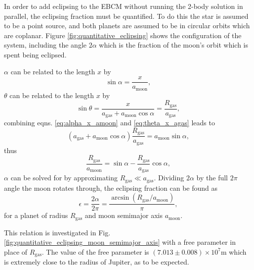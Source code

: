 \documentclass[12pt, onecolumn]{revtex4-2}    %
\begin{document}
In order to add eclipsing to the EBCM without running the 2-body solution in parallel, the eclipsing fraction must be quantified.
To do this the star is assumed to be a point source, and both planets are assumed to be in circular orbits which are coplanar.
Figure \ref{fig:quantitative_eclipsing} shows the configuration of the system, including the angle $2\alpha$ which is the fraction of the moon's orbit which is spent being eclipsed.

$\alpha$ can be related to the length $x$ by
\begin{equation}
  \sin \alpha = \frac{x}{a_\text{moon}}, \label{eq:alpha_x_amoon}
\end{equation}
$\theta$ can be related to the length $x$ by
\begin{equation}
  \sin \theta = \frac{x}{a_\text{gas} + a_\text{moon} \cos\alpha} = \frac{R_\text{gas}}{a_\text{gas}} , \label{eq:theta_x_agas}
\end{equation}
combining eqns. \eqref{eq:alpha_x_amoon} and \eqref{eq:theta_x_agas} leads to
\begin{equation}
  (a_\text{gas} + a_\text{moon}\cos\alpha) \frac{R_\text{gas}}{a_\text{gas}} = a_\text{moon} \sin\alpha,
\end{equation}
thus
\begin{equation}
  \frac{R_\text{gas}}{a_\text{moon}} = \sin\alpha - \frac{R_\text{gas}}{a_\text{gas}}\cos\alpha,
\end{equation}
$\alpha$ can be solved for by approximating $R_\text{gas} \ll a_\text{gas}$.
Dividing $2\alpha$ by the full $2\pi$ angle the moon rotates through, the eclipsing fraction can be found as
\begin{equation}
  \epsilon = \frac{2\alpha}{2\pi} = \frac{\arcsin(R_\text{gas} / a_\text{moon})}{\pi},
  \label{eq:eclipsing_fraction}
\end{equation}
for a planet of radius $R_\text{gas}$ and moon semimajor axis $a_\text{moon}$.

This relation is investigated in Fig. \ref{fig:quantitative_eclipsing_moon_semimajor_axis} with a free parameter in place of $R_\text{gas}$.
The value of the free parameter is $(7.013\pm 0.008) \times 10^7 \text{m}$ which is extremely close to the radius of Jupiter, as to be expected.
\end{document}
